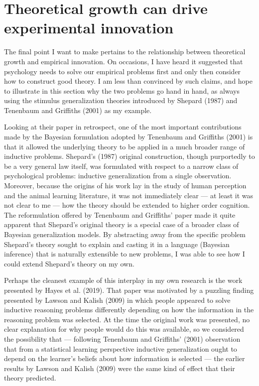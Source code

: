 \documentclass[
  english,
  doc]{apa6}
\begin{document}
\hypertarget{theoretical-growth-can-drive-experimental-innovation}{%
\section{Theoretical growth can drive experimental innovation}\label{theoretical-growth-can-drive-experimental-innovation}}

\noindent
The final point I want to make pertains to the relationship between theoretical growth and empirical innovation. On occasions, I have heard it suggested that psychology needs to solve our empirical problems first and only then consider how to construct good theory. I am less than convinced by such claims, and hope to illustrate in this section why the two problems go hand in hand, as always using the stimulus generalization theories introduced by Shepard (1987) and Tenenbaum and Griffiths (2001) as my example.

Looking at their paper in retrospect, one of the most important contributions made by the Bayesian formulation adopted by Tenenbaum and Griffiths (2001) is that it allowed the underlying theory to be applied in a much broader range of inductive problems. Shepard's (1987) original construction, though purportedly to be a very general law itself, was formulated with respect to a narrow class of psychological problems: inductive generalization from a single observation. Moreover, because the origins of his work lay in the study of human perception and the animal learning literature, it was not immediately clear --- at least it was not clear to me --- how the theory should be extended to higher order cognition. The reformulation offered by Tenenbaum and Griffiths' paper made it quite apparent that Shepard's original theory is a special case of a broader class of Bayesian generalization models. By abstracting away from the specific problem Shepard's theory sought to explain and casting it in a language (Bayesian inference) that is naturally extensible to new problems, I was able to see how I could extend Shepard's theory on my own.

Perhaps the cleanest example of this interplay in my own research is the work presented by Hayes et al. (2019). That paper was motivated by a puzzling finding presented by Lawson and Kalish (2009) in which people appeared to solve inductive reasoning problems differently depending on how the information in the reasoning problem was selected. At the time the original work was presented, no clear explanation for why people would do this was available, so we considered the possibility that --- following Tenenbaum and Griffiths' (2001) observation that from a statistical learning perspective inductive generalization ought to depend on the learner's beliefs about how information is selected --- the earlier results by Lawson and Kalish (2009) were the same kind of effect that their theory predicted.
\end{document}
